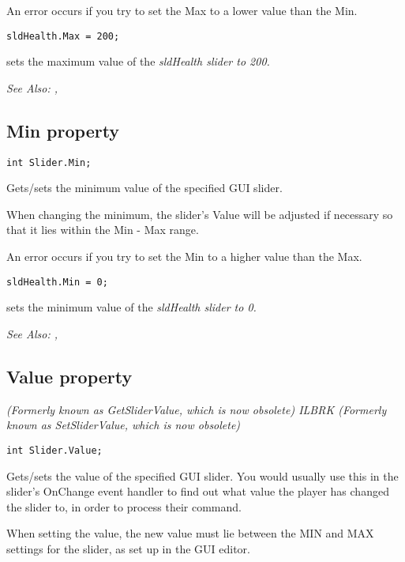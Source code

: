 An error occurs if you try to set the Max to a lower value than the Min.

\begin{verbatim}
sldHealth.Max = 200;
\end{verbatim}
sets the maximum value of the \it{sldHealth} slider to 200.

\it{See Also:} ,


\subsection{Min property}\label{Slider.Min}%

\begin{verbatim}
int Slider.Min;
\end{verbatim}
Gets/sets the minimum value of the specified GUI slider.

When changing the minimum, the slider's Value will be adjusted if
necessary so that it lies within the Min - Max range.

An error occurs if you try to set the Min to a higher value than the Max.

\begin{verbatim}
sldHealth.Min = 0;
\end{verbatim}
sets the minimum value of the \it{sldHealth} slider to 0.

\it{See Also:} ,


\subsection{Value property}\label{Slider.Value}%

\it{(Formerly known as GetSliderValue, which is now obsolete)} ILBRK
\it{(Formerly known as SetSliderValue, which is now obsolete)}

\begin{verbatim}
int Slider.Value;
\end{verbatim}
Gets/sets the value of the specified GUI slider. You would usually
use this in the slider's OnChange event handler to find out what value the
player has changed the slider to, in order to process their command.

When setting the value, the new value must lie between the MIN and MAX settings
for the slider, as set up in the GUI editor.

